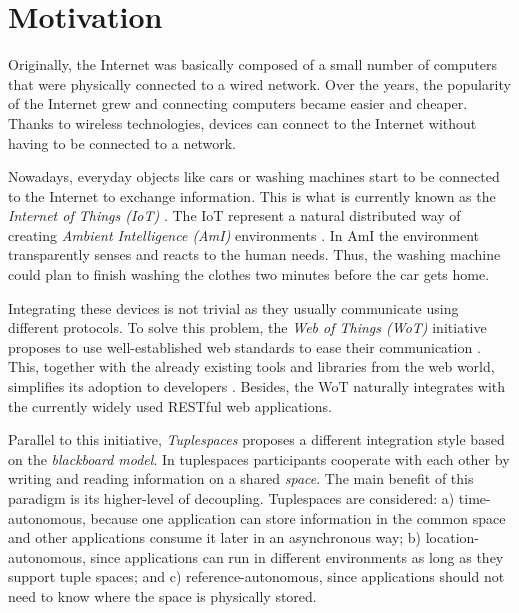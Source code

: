 


\section{Motivation}
\label{sec:Motivation}


Originally, the Internet was basically composed of a small number of computers that were physically connected to a wired network.
Over the years, the popularity of the Internet grew and connecting computers became easier and cheaper.
Thanks to wireless technologies, devices can connect to the Internet without having to be connected to a network.

Nowadays, everyday objects like cars or washing machines start to be connected to the Internet to exchange information.
This is what is currently known as the \emph{Internet of Things (IoT)} \cite{atzori_internet_2010}.
The IoT represent a natural distributed way of creating \emph{Ambient Intelligence (AmI)} environments \cite{caceres_ubicomp_2012}. %
In AmI the environment transparently senses and reacts to the human needs.
Thus, the washing machine could plan to finish washing the clothes two minutes before the car gets home.

\medskip

Integrating these devices is not trivial as they usually communicate using different protocols.
To solve this problem, the \emph{Web of Things (WoT)} initiative proposes to use well-established web standards to ease their communication \cite{guinard_thesis_2011}.
This, together with the already existing tools and libraries from the web world, simplifies its adoption to developers \cite{guinard_search_2011}.
Besides, the WoT naturally integrates with the currently widely used RESTful web applications.

Parallel to this initiative, \emph{Tuplespaces} \cite{gelernter_generative_1985} proposes a different integration style based on the \emph{blackboard model}.
In tuplespaces participants cooperate with each other by writing and reading information on a shared \emph{space}.
The main benefit of this paradigm is its higher-level of decoupling.
Tuplespaces are considered:
a) time-autonomous, because one application can store information in the common space and other applications consume it later in an asynchronous way;
b) location-autonomous, since applications can run in different environments as long as they support tuple spaces;
and c) reference-autonomous, since applications should not need to know where the space is physically stored.


